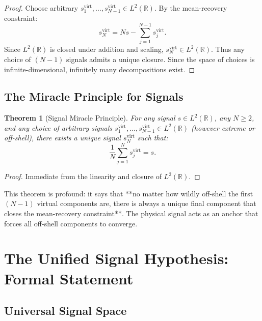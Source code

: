 \documentclass[twocolumn,11pt,a4paper]{article}
\newtheorem{theorem}{Theorem}[section]
\newcommand{\signal}{s}
\newcommand{\virt}{\text{virt}}
\begin{document}
\begin{proof}
Choose arbitrary $\signal_1^{\virt}, \ldots, \signal_{N-1}^{\virt} \in L^2(\mathbb{R})$. By the mean-recovery constraint:
\begin{equation}
  \signal_N^{\virt} = N\signal - \sum_{j=1}^{N-1} \signal_j^{\virt}.
\end{equation}
Since $L^2(\mathbb{R})$ is closed under addition and scaling, $\signal_N^{\virt} \in L^2(\mathbb{R})$. Thus any choice of $(N-1)$ signals admits a unique closure. Since the space of choices is infinite-dimensional, infinitely many decompositions exist.
\end{proof}

\subsection{The Miracle Principle for Signals}

\begin{theorem}[Signal Miracle Principle]
For any signal $\signal \in L^2(\mathbb{R})$, any $N \geq 2$, and any choice of arbitrary signals $\signal_1^{\virt}, \ldots, \signal_{N-1}^{\virt} \in L^2(\mathbb{R})$ (however extreme or off-shell), there exists a unique signal $\signal_N^{\virt}$ such that:
\begin{equation}
  \frac{1}{N}\sum_{j=1}^{N} \signal_j^{\virt} = \signal.
\end{equation}
\end{theorem}

\begin{proof}
Immediate from the linearity and closure of $L^2(\mathbb{R})$.
\end{proof}

This theorem is profound: it says that **no matter how wildly off-shell the first $(N-1)$ virtual components are, there is always a unique final component that closes the mean-recovery constraint**. The physical signal acts as an anchor that forces all off-shell components to converge.

\section{The Unified Signal Hypothesis: Formal Statement}
\label{sec:mean_recovery}

\subsection{Universal Signal Space}
\end{document}
